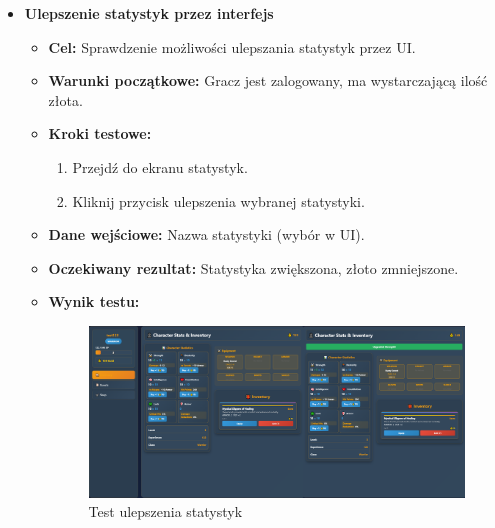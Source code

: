 \begin{itemize}
    \item \textbf{Ulepszenie statystyk przez interfejs}
    \begin{itemize}
        \item \textbf{Cel:} Sprawdzenie możliwości ulepszania statystyk przez UI.
        \item \textbf{Warunki początkowe:} Gracz jest zalogowany, ma wystarczającą ilość złota.
        \item \textbf{Kroki testowe:}
        \begin{enumerate}
            \item Przejdź do ekranu statystyk.
            \item Kliknij przycisk ulepszenia wybranej statystyki.
        \end{enumerate}
        \item \textbf{Dane wejściowe:} Nazwa statystyki (wybór w UI).
        \item \textbf{Oczekiwany rezultat:} Statystyka zwiększona, złoto zmniejszone.
        \item \textbf{Wynik testu:}
        \begin{figure}[H]
            \includegraphics[width=480px]{figures/testy/test-upgradestat-front.png}
            \caption{Test ulepszenia statystyk}
        \end{figure}
    \end{itemize}
\end{itemize}



